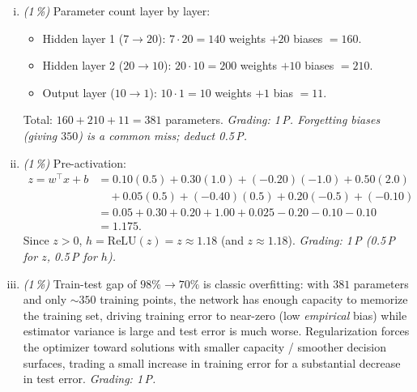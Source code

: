 \documentclass[11pt,a4paper]{article}
\newcommand{\subpoints}[1]{\textit{(#1\,\%)}}
\begin{document}
\begin{enumerate}[(i)]
  \item \subpoints{1} Parameter count layer by layer:
        \begin{itemize}
          \item Hidden layer 1 ($7 \to 20$): $7\cdot 20 = 140$ weights $+ 20$ biases $= 160$.
          \item Hidden layer 2 ($20 \to 10$): $20\cdot 10 = 200$ weights $+ 10$ biases $= 210$.
          \item Output layer ($10 \to 1$): $10\cdot 1 = 10$ weights $+ 1$ bias $= 11$.
        \end{itemize}
        Total: $160 + 210 + 11 = \boxed{381}$ parameters.
        \emph{Grading: 1\,P. Forgetting biases (giving $350$) is a common miss; deduct 0.5\,P.}

  \item \subpoints{1} Pre-activation:
        \begin{align*}
        z = w^\top x + b
          &= 0.10(0.5) + 0.30(1.0) + (-0.20)(-1.0) + 0.50(2.0) \\
          &\quad + 0.05(0.5) + (-0.40)(0.5) + 0.20(-0.5) + (-0.10) \\
          &= 0.05 + 0.30 + 0.20 + 1.00 + 0.025 - 0.20 - 0.10 - 0.10 \\
          &= 1.175.
        \end{align*}
        Since $z > 0$, $h = \mathrm{ReLU}(z) = z \approx \boxed{1.18}$ (and $z \approx \boxed{1.18}$).
        \emph{Grading: 1\,P (0.5\,P for $z$, 0.5\,P for $h$).}

  \item \subpoints{1} Train-test gap of $98\% \to 70\%$ is classic overfitting: with $381$
        parameters and only $\sim 350$ training points, the network has enough capacity to
        memorize the training set, driving training error to near-zero (low \emph{empirical}
        bias) while estimator variance is large and test error is much worse. Regularization
        forces the optimizer toward solutions with smaller capacity / smoother decision
        surfaces, trading a small increase in training error for a substantial decrease in
        test error.
        \emph{Grading: 1\,P.}


\end{enumerate}
\end{document}
